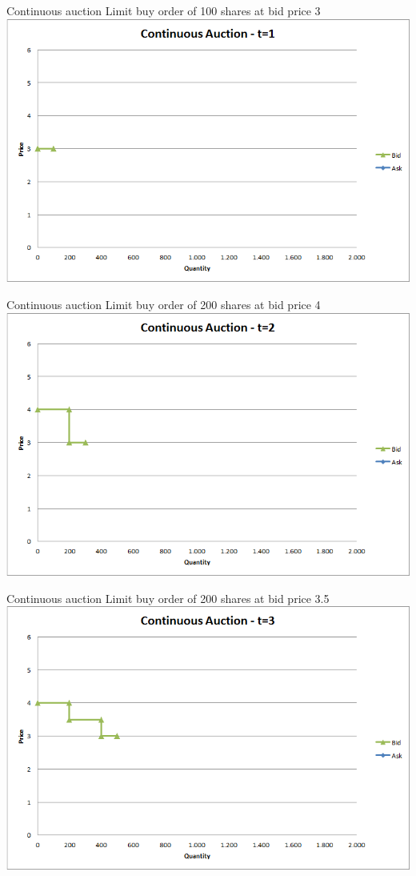 \documentclass[english,10pt
,aspectratio=169
]{beamer}
\begin{document}
\begin{frame}{Continuous auction}
	Limit buy order of 100 shares at bid price 3
	\quad
	\center
	\includegraphics[width=.75\linewidth]{pics/ch1/Continuous_t1}
\end{frame}


\begin{frame}{Continuous auction}
	Limit buy order of 200 shares at bid price 4
	\quad
	\center
	\includegraphics[width=.75\linewidth]{pics/ch1/Continuous_t2}
\end{frame}


\begin{frame}{Continuous auction}
	Limit buy order of 200 shares at bid price 3.5
	\quad
	\center
	\includegraphics[width=.75\linewidth]{pics/ch1/Continuous_t3}
\end{frame}
\end{document}
